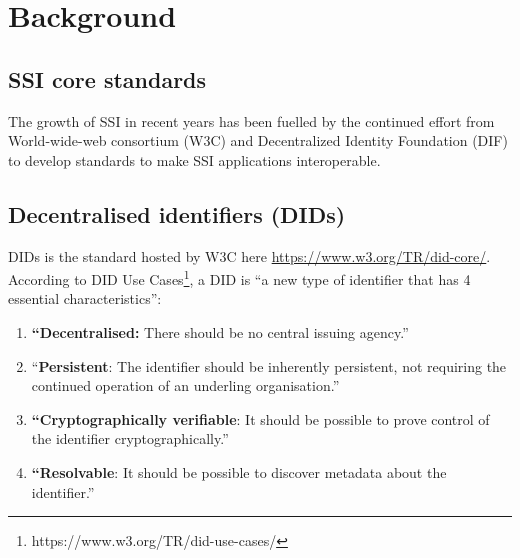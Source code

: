 \hypertarget{background}{%
\chapter{Background}\label{background}}


\hypertarget{ssi-core-standards}{%
\section{SSI core standards}\label{ssi-core-standards}}

The growth of SSI in recent years has been fuelled by the continued effort from World-wide-web consortium (W3C) and Decentralized Identity Foundation (DIF) to develop standards to make SSI applications interoperable.

\hypertarget{decentralised-identifiers-dids}{%
\section{Decentralised identifiers
(DIDs)}\label{decentralised-identifiers-dids}}

DIDs is the standard hosted by W3C here \url{https://www.w3.org/TR/did-core/}. According to DID Use Cases\footnote{https://www.w3.org/TR/did-use-cases/}, a DID is ``a new type of identifier that has 4 essential characteristics'':

\begin{enumerate}
\def\labelenumi{\arabic{enumi}.}
\tightlist
\item
  \textbf{``Decentralised:} There should be no central issuing agency.''
\item
  ``\textbf{Persistent}: The identifier should be inherently persistent,
  not requiring the continued operation of an underling organisation.''
\item
  \textbf{``Cryptographically verifiable}: It should be possible to prove
  control of the identifier cryptographically.''
\item
  \textbf{``Resolvable}: It should be possible to discover metadata about
  the identifier.''
\end{enumerate}



\pagebreak





